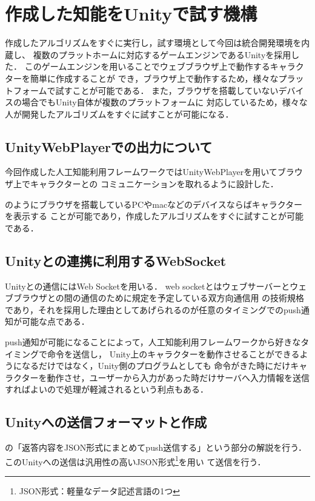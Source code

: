 \newpage


\section{作成した知能をUnityで試す機構}
作成したアルゴリズムをすぐに実行し，試す環境として今回は統合開発環境を内蔵し、
複数のプラットホームに対応するゲームエンジンであるUnityを採用した．
このゲームエンジンを用いることでウェブブラウザ上で動作するキャラクターを簡単に作成することが
でき，ブラウザ上で動作するため，様々なプラットフォームで試すことが可能である．
また，ブラウザを搭載していないデバイスの場合でもUnity自体が複数のプラットフォームに
対応しているため，様々な人が開発したアルゴリズムをすぐに試すことが可能になる．

\subsection{UnityWebPlayerでの出力について}
今回作成した人工知能利用フレームワークではUnityWebPlayerを用いてブラウザ上でキャラクターとの
コミュニケーションを取れるように設計した．


のようにブラウザを搭載しているPCやmacなどのデバイスならばキャラクターを表示する
ことが可能であり，作成したアルゴリズムをすぐに試すことが可能である．

\subsection{Unityとの連携に利用するWebSocket}
Unityとの通信にはWeb Socketを用いる．
web socketとはウェブサーバーとウェブブラウザとの間の通信のために規定を予定している双方向通信用
の技術規格であり，それを採用した理由としてあげられるのが任意のタイミングでのpush通知が可能な点である．

push通知が可能になることによって，人工知能利用フレームワークから好きなタイミングで命令を送信し，
Unity上のキャラクターを動作させることができるようになるだけではなく，Unity側のプログラムとしても
命令がきた時にだけキャラクターを動作させ，ユーザーから入力があった時だけサーバへ入力情報を送信
すればよいので処理が軽減されるという利点もある．

\subsection{Unityへの送信フォーマットと作成}
の「返答内容をJSON形式にまとめてpush送信する」という部分の解説を行う．
このUnityへの送信は汎用性の高いJSON形式\footnote{JSON形式：軽量なデータ記述言語の1つ}を用い
て送信を行う．

